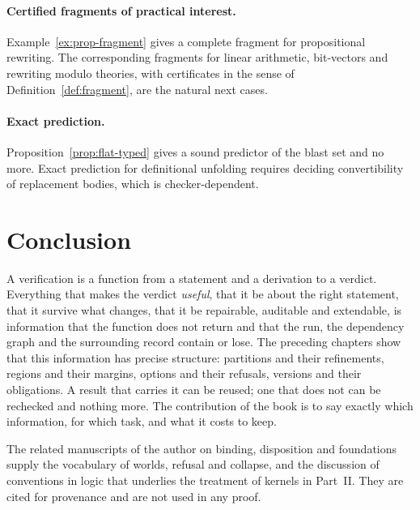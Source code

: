 \paragraph{Certified fragments of practical interest.} Example~\ref{ex:prop-fragment} gives a complete fragment for propositional rewriting. The corresponding fragments for linear arithmetic, bit-vectors and rewriting modulo theories, with certificates in the sense of Definition~\ref{def:fragment}, are the natural next cases.

\paragraph{Exact prediction.} Proposition~\ref{prop:flat-typed} gives a sound predictor of the blast set and no more. Exact prediction for definitional unfolding requires deciding convertibility of replacement bodies, which is checker-dependent.

\section{Conclusion}

A verification is a function from a statement and a derivation to a verdict. Everything that makes the verdict \emph{useful}, that it be about the right statement, that it survive what changes, that it be repairable, auditable and extendable, is information that the function does not return and that the run, the dependency graph and the surrounding record contain or lose. The preceding chapters show that this information has precise structure: partitions and their refinements, regions and their margins, options and their refusals, versions and their obligations. A result that carries it can be reused; one that does not can be rechecked and nothing more. The contribution of the book is to say exactly which information, for which task, and what it costs to keep.

The related manuscripts of the author on binding, disposition and foundations \cite{flyxion-binding,flyxion-disposition,flyxion-foundations} supply the vocabulary of worlds, refusal and collapse, and the discussion of conventions in logic that underlies the treatment of kernels in Part~II. They are cited for provenance and are not used in any proof.
